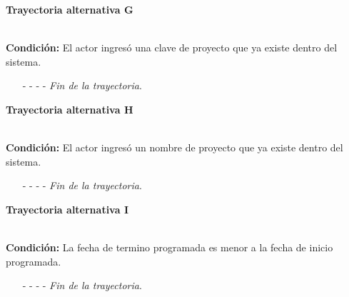 \hypertarget{CU2-1:TAG}{\textbf{Trayectoria alternativa G}}\\
\noindent \textbf{Condición:} El actor ingresó una clave de proyecto que ya existe dentro del sistema.
\begin{enumerate}
	\UCpaso[\UCsist] Muestra el mensaje  señalando el campo que presenta la duplicidad en la pantalla .
	\UCpaso Regresa al paso \ref{CU2.1-P5} de la trayectoria principal.
	\item[- -] - - {\em {Fin de la trayectoria}}.
\end{enumerate}
\hypertarget{CU2-1:TAH}{\textbf{Trayectoria alternativa H}}\\
\noindent \textbf{Condición:} El actor ingresó un nombre de proyecto que ya existe dentro del sistema.
\begin{enumerate}
	\UCpaso[\UCsist] Muestra el mensaje  señalando el campo que presenta la duplicidad en la pantalla .
	\UCpaso Regresa al paso \ref{CU2.1-P5} de la trayectoria principal.
	\item[- -] - - {\em {Fin de la trayectoria}}.
\end{enumerate}
\hypertarget{CU2-1:TAI}{\textbf{Trayectoria alternativa I}}\\
\noindent \textbf{Condición:} La fecha de termino programada es menor a la fecha de inicio programada.
\begin{enumerate}
	\UCpaso[\UCsist] Muestra el mensaje  en el campo de fecha de término programada en la pantalla .
	\UCpaso Regresa al paso \ref{CU2.1-P5} de la trayectoria principal.
	\item[- -] - - {\em {Fin de la trayectoria}}.
\end{enumerate}